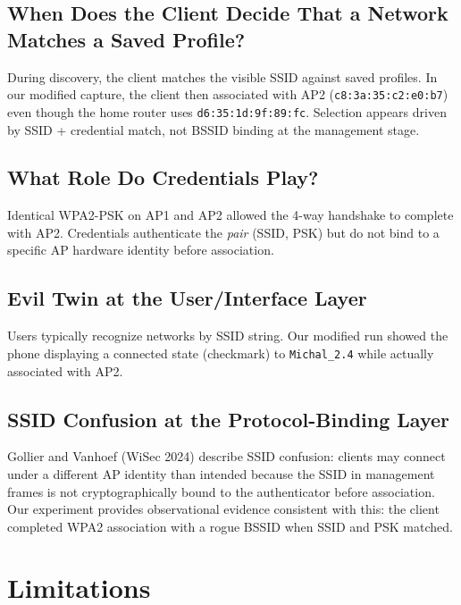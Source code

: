 \documentclass[12pt,a4paper]{article}
\begin{document}
\subsection{When Does the Client Decide That a Network Matches a Saved Profile?}

During discovery, the client matches the visible SSID against saved profiles. In our modified capture, the client then associated with AP2 (\texttt{c8:3a:35:c2:e0:b7}) even though the home router uses \texttt{d6:35:1d:9f:89:fc}. Selection appears driven by SSID + credential match, not BSSID binding at the management stage.

\subsection{What Role Do Credentials Play?}

Identical WPA2-PSK on AP1 and AP2 allowed the 4-way handshake to complete with AP2. Credentials authenticate the \emph{pair} (SSID, PSK) but do not bind to a specific AP hardware identity before association.

\subsection{Evil Twin at the User/Interface Layer}

Users typically recognize networks by SSID string. Our modified run showed the phone displaying a connected state (checkmark) to \texttt{Michal\_2.4} while actually associated with AP2.

\subsection{SSID Confusion at the Protocol-Binding Layer}

Gollier and Vanhoef (WiSec 2024) describe SSID confusion: clients may connect under a different AP identity than intended because the SSID in management frames is not cryptographically bound to the authenticator before association. Our experiment provides observational evidence consistent with this: the client completed WPA2 association with a rogue BSSID when SSID and PSK matched.

\section{Limitations}
\end{document}
